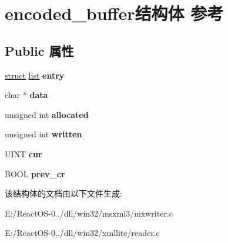 \hypertarget{structencoded__buffer}{}\section{encoded\+\_\+buffer结构体 参考}
\label{structencoded__buffer}
\subsection*{Public 属性}
\begin{DoxyCompactItemize}
\item 
\mbox{\label{structencoded__buffer_a461e39ee4bd4d68921fd80daae0288d4}} 
\hyperlink{interfacestruct}{struct} \hyperlink{classlist}{list} {\bfseries entry}
\item 
\mbox{\label{structencoded__buffer_a7f236006d0d447456c97a4b026d52a96}} 
char $\ast$ {\bfseries data}
\item 
\mbox{\label{structencoded__buffer_afdfd0c2ce3d560871c07a74176b0d663}} 
unsigned int {\bfseries allocated}
\item 
\mbox{\label{structencoded__buffer_ab64e0728bb544e93949a6b9b4a488e4a}} 
unsigned int {\bfseries written}
\item 
\mbox{\label{structencoded__buffer_aa1b7efbbe0c18387cd2766197f70db38}} 
U\+I\+NT {\bfseries cur}
\item 
\mbox{\label{structencoded__buffer_ad7c4f1c06bb87237ab3418917cda8a94}} 
B\+O\+OL {\bfseries prev\+\_\+cr}
\end{DoxyCompactItemize}


该结构体的文档由以下文件生成\+:\begin{DoxyCompactItemize}
\item 
E\+:/\+React\+O\+S-\/0../dll/win32/msxml3/mxwriter.\+c\item 
E\+:/\+React\+O\+S-\/0../dll/win32/xmllite/reader.\+c\end{DoxyCompactItemize}
